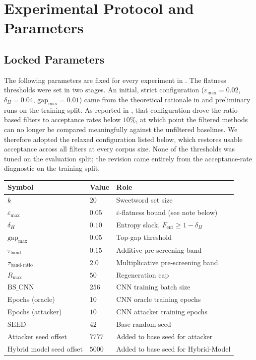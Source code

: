 \section{Experimental Protocol and Parameters}
\label{sec:method-protocol}

\subsection{Locked Parameters}

The following parameters are fixed for every experiment in
. The flatness thresholds were set in two stages. An
initial, strict configuration ($\varepsilon_{\max} = 0.02$,
$\delta_{H} = 0.04$, $\text{gap}_{\max} = 0.01$) came from the
theoretical rationale in  and preliminary
runs on the training split. As reported in
, that configuration drove the
ratio-based filters to acceptance rates below $10\%$, at which point the
filtered methods can no longer be compared meaningfully against the
unfiltered baselines. We therefore adopted the relaxed configuration
listed below, which restores usable acceptance across all filters at
every corpus size. None of the thresholds was tuned on the evaluation
split; the revision came entirely from the acceptance-rate diagnostic on
the training split.

\begin{center}
\begin{tabular}{lll}
\toprule
\textbf{Symbol} & \textbf{Value} & \textbf{Role} \\
\midrule
$k$                       & $20$    & Sweetword set size \\
$\varepsilon_{\max}$      & $0.05$  & $\varepsilon$-flatness bound (see note below) \\
$\delta_{H}$              & $0.10$  & Entropy slack, $F_{\text{ent}} \ge 1 - \delta_{H}$ \\
$\text{gap}_{\max}$       & $0.05$  & Top-gap threshold \\
$\tau_{\text{band}}$      & $0.15$  & Additive pre-screening band \\
$\tau_{\text{band-ratio}}$& $2.0$   & Multiplicative pre-screening band \\
$R_{\max}$                & $50$    & Regeneration cap \\
$\text{BS\_CNN}$          & $256$   & CNN training batch size \\
Epochs (oracle)           & $10$    & CNN oracle training epochs \\
Epochs (attacker)         & $10$    & CNN attacker training epochs \\
$\text{SEED}$             & $42$    & Base random seed \\
Attacker seed offset      & $7777$  & Added to base seed for attacker \\
Hybrid model seed offset  & $5000$  & Added to base seed for Hybrid-Model \\
\bottomrule
\end{tabular}
\end{center}

